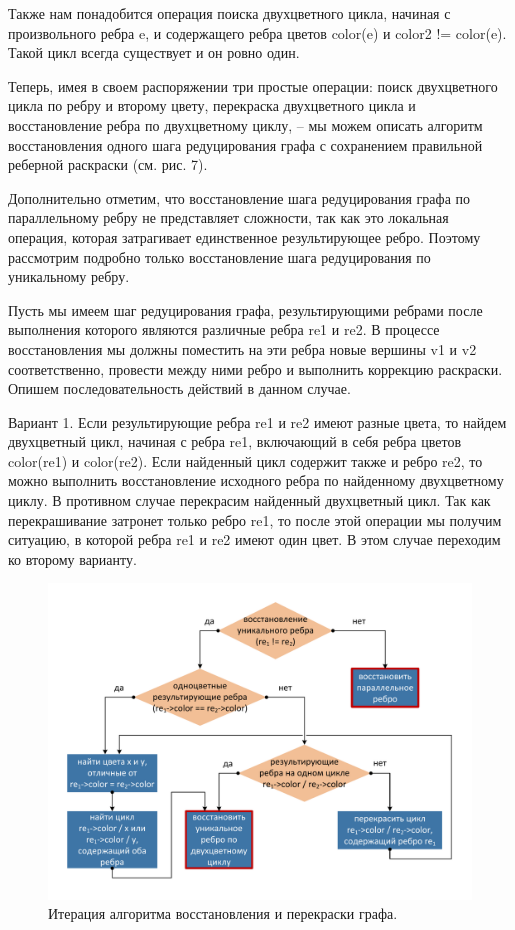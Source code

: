 Также нам понадобится операция поиска двухцветного цикла, начиная с произвольного ребра e, и содержащего ребра цветов color(e) и color2 != color(e). Такой цикл всегда существует и он ровно один.

Теперь, имея в своем распоряжении три простые операции: поиск двухцветного цикла по ребру и второму цвету, перекраска двухцветного цикла и восстановление ребра по двухцветному циклу, – мы можем описать алгоритм восстановления одного шага редуцирования графа с сохранением правильной реберной раскраски (см. рис. 7).

Дополнительно отметим, что восстановление шага редуцирования графа по параллельному ребру не представляет сложности, так как это локальная операция, которая затрагивает единственное результирующее ребро. Поэтому рассмотрим подробно только восстановление шага редуцирования по уникальному ребру.

Пусть мы имеем шаг редуцирования графа, результирующими ребрами после выполнения которого являются различные ребра re1 и re2.
В процессе восстановления мы должны поместить на эти ребра новые вершины v1 и v2 соответственно, провести между ними ребро и выполнить коррекцию раскраски. Опишем последовательность действий в данном случае.

Вариант 1. Если результирующие ребра re1 и re2 имеют разные цвета, то найдем двухцветный цикл, начиная с ребра re1, включающий в себя ребра цветов color(re1) и color(re2).
Если найденный цикл содержит также и ребро re2, то можно выполнить восстановление исходного ребра по найденному двухцветному циклу. В противном случае перекрасим найденный двухцветный цикл.
Так как перекрашивание затронет только ребро re1, то после этой операции мы получим ситуацию, в которой ребра re1 и re2 имеют один цвет. В этом случае переходим ко второму варианту.

\begin{figure}[ht]
	\centering
		\includegraphics[width=1.0\textwidth]{./pics/text_3_edge_coloring/7-algorithm.pdf}
	\caption{Итерация алгоритма восстановления и перекраски графа.}
	\label{fig:text_3_edge_coloring_7}
\end{figure}

